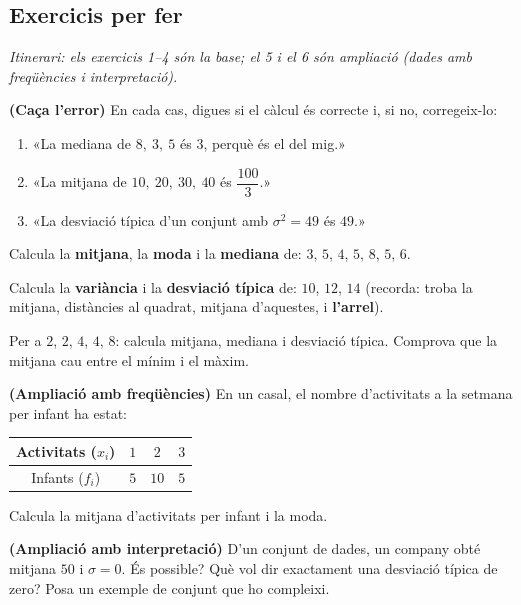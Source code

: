 \subsection{Exercicis per fer}

\noindent\textit{Itinerari: els exercicis 1–4 són la base; el 5 i el 6 són
ampliació (dades amb freqüències i interpretació).}

\begin{exercicis}
\begin{exlist}
  \item \textbf{(Caça l'error)} En cada cas, digues si el càlcul és correcte i, si no,
        corregeix-lo:
    \begin{enumerate}[label=\alph*), leftmargin=1.6em, topsep=2pt]
      \item «La mediana de $8,\ 3,\ 5$ és $3$, perquè és el del mig.»
      \item «La mitjana de $10,\ 20,\ 30,\ 40$ és $\dfrac{100}{3}$.»
      \item «La desviació típica d'un conjunt amb $\sigma^2=49$ és $49$.»
    \end{enumerate}
  \item Calcula la \textbf{mitjana}, la \textbf{moda} i la \textbf{mediana} de:
        $3$, $5$, $4$, $5$, $8$, $5$, $6$.
  \item Calcula la \textbf{variància} i la \textbf{desviació típica} de:
        $10$, $12$, $14$ (recorda: troba la mitjana, distàncies al quadrat, mitjana
        d'aquestes, i \textbf{l'arrel}).
  \item Per a $2$, $2$, $4$, $4$, $8$: calcula mitjana, mediana i desviació típica.
        Comprova que la mitjana cau entre el mínim i el màxim.
  \item \textbf{(Ampliació amb freqüències)} En un casal, el nombre d'activitats a la
        setmana per infant ha estat:
        \begin{center}
        \begin{tabular}{c c c c}
        \toprule
        Activitats ($x_i$) & $1$ & $2$ & $3$ \\
        \midrule
        Infants ($f_i$) & $5$ & $10$ & $5$ \\
        \bottomrule
        \end{tabular}
        \end{center}
        Calcula la mitjana d'activitats per infant i la moda.
  \item \textbf{(Ampliació amb interpretació)} D'un conjunt de dades, un company
        obté mitjana $50$ i $\sigma=0$. És possible? Què vol dir exactament una
        desviació típica de zero? Posa un exemple de conjunt que ho compleixi.
\end{exlist}
\end{exercicis}

